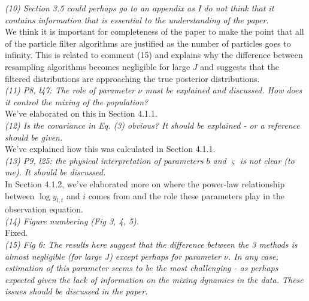 \documentclass{article}
\begin{document}
\noindent \emph{(10) Section 3.5 could perhaps go to an appendix as I do not think that it contains information that is essential to the understanding of the paper.} \\

We think it is important for completeness of the paper to make the point that all of the particle filter algorithms are justified as the number of particles goes to infinity. This is related to comment (15) and explains why the difference between resampling algorithms becomes negligible for large $J$ and suggests that the filtered distributions are approaching the true posterior distributions. \\

\noindent \emph{(11) P8, l47: The role of parameter $\nu$ must be explained and discussed. How does it control the mixing of the population?} \\

We've elaborated on this in Section 4.1.1. \\

\noindent \emph{(12) Is the covariance in Eq. (3) obvious? It should be explained - or a reference should be given.} \\

We've explained how this was calculated in Section 4.1.1. \\

\noindent \emph{(13) P9, l25: the physical interpretation of parameters $b$ and $\varsigma$ is not clear (to me). It should be discussed.} \\

In Section 4.1.2, we've elaborated more on where the power-law relationship between $\log y_{l,t}$ and $i$ comes from and the role these parameters play in the observation equation. \\

\noindent \emph{(14) Figure numbering (Fig 3, 4, 5).} \\

Fixed. \\

\noindent \emph{(15) Fig 6: The results here suggest that the difference between the 3 methods is almost negligible (for large J) except perhaps for parameter $\nu$. In any case, estimation of this parameter seems to be the most challenging - as perhaps expected given the lack of information on the mixing dynamics in the data. These issues should be discussed in the paper.} \\
\end{document}

